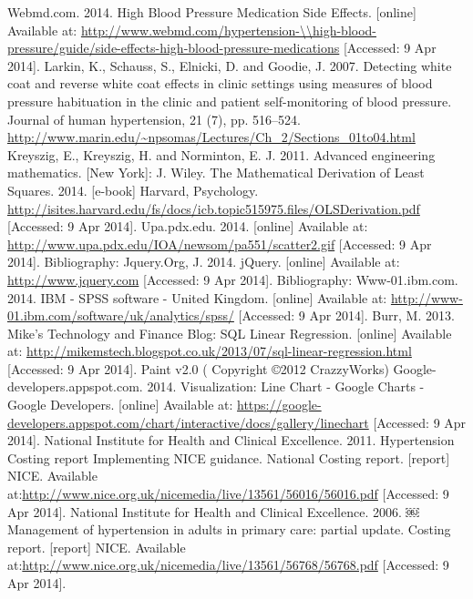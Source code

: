 \documentclass[11pt]{article}
\begin{document}
\begin{thebibliography}{40}
\footnotesize
\begin{singlespace}
Webmd.com. 2014. High Blood Pressure Medication Side Effects. [online] Available at: \url{http://www.webmd.com/hypertension-\\high-blood-pressure/guide/side-effects-high-blood-pressure-medications} [Accessed: 9 Apr 2014].
Larkin, K., Schauss, S., Elnicki, D. and Goodie, J. 2007. Detecting white coat and reverse white coat effects in clinic settings using measures of blood pressure habituation in the clinic and patient self-monitoring of blood pressure. Journal of human hypertension, 21 (7), pp. 516--524.
\url{http://www.marin.edu/~npsomas/Lectures/Ch\_2/Sections\_01to04.html} %
Kreyszig, E., Kreyszig, H. and Norminton, E. J. 2011. Advanced engineering mathematics. [New York]: J. Wiley.
The Mathematical Derivation of Least Squares. 2014. [e-book] Harvard, Psychology. \url{http://isites.harvard.edu/fs/docs/icb.topic515975.files/OLSDerivation.pdf} [Accessed: 9 Apr 2014].
Upa.pdx.edu. 2014. [online] Available at: \url{http://www.upa.pdx.edu/IOA/newsom/pa551/scatter2.gif} [Accessed: 9 Apr 2014].
Bibliography: Jquery.Org, J. 2014. jQuery. [online] Available at: \url{http://www.jquery.com} [Accessed: 9 Apr 2014].
Bibliography: Www-01.ibm.com. 2014. IBM - SPSS software - United Kingdom. [online] Available at: \url{http://www-01.ibm.com/software/uk/analytics/spss/} [Accessed: 9 Apr 2014].
Burr, M. 2013. Mike's Technology and Finance Blog: SQL Linear Regression. [online] Available at: \url{http://mikemstech.blogspot.co.uk/2013/07/sql-linear-regression.html} [Accessed: 9 Apr 2014].
Paint v2.0 ( Copyright ©2012 CrazzyWorks) 
Google-developers.appspot.com. 2014. Visualization: Line Chart - Google Charts - Google Developers. [online] Available at: \url{https://google-developers.appspot.com/chart/interactive/docs/gallery/linechart} [Accessed: 9 Apr 2014].
National Institute for Health and Clinical Excellence. 2011. Hypertension Costing report Implementing NICE guidance. National Costing report. [report] NICE. Available at:\url{http://www.nice.org.uk/nicemedia/live/13561/56016/56016.pdf} [Accessed: 9 Apr 2014].
National Institute for Health and Clinical Excellence. 2006. ￼ Management of hypertension in adults in primary care: partial update. Costing report. [report] NICE. Available at:\url{http://www.nice.org.uk/nicemedia/live/13561/56768/56768.pdf} [Accessed: 9 Apr 2014].

\end{singlespace}
\end{thebibliography}
\end{document}
